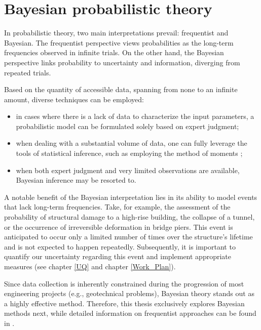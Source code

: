 \chapter{Bayesian probabilistic theory}

\label{ch:Bayesian}
In probabilistic theory, two main interpretations prevail: frequentist and Bayesian. The frequentist perspective views probabilities as the long-term frequencies observed in infinite trials. On the other hand, the Bayesian perspective links probability to uncertainty and information, diverging from repeated trials. 

Based on the quantity of accessible data, spanning from none to an infinite amount, diverse techniques can be employed:

\begin{itemize}[left=0pt]
 \item in cases where there is a lack of data to characterize the input parameters, a probabilistic model can be formulated solely based on expert judgment;
 \item when dealing with a substantial volume of data, one can fully leverage the tools of statistical inference, such as employing the method of moments \citep{wagner2020};
 \item when both expert judgment and very limited observations are available, Bayesian inference may be resorted to.
\end{itemize}

A notable benefit of the Bayesian interpretation lies in its ability to model events that lack long-term frequencies. Take, for example, the assessment of the probability of structural damage to a high-rise building, the collapse of a tunnel, or the occurrence of irreversible deformation in bridge piers. This event is anticipated to occur only a limited number of times over the structure's lifetime and is not expected to happen repeatedly. Subsequently, it is important to quantify our uncertainty regarding this event and implement appropriate measures (see chapter \ref{UQ} and chapter \ref{Work_Plan}).

Since data collection is inherently constrained during the progression of most engineering projects (e.g., geotechnical problems), Bayesian theory stands out as a highly effective method. Therefore, this thesis exclusively explores Bayesian methods next, while detailed information on frequentist approaches can be found in \cite{murphy2012}.






